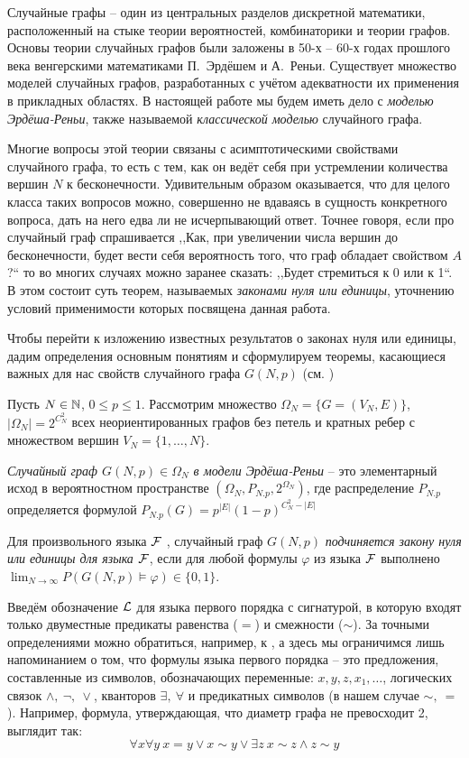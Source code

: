    Случайные графы -- один из центральных разделов дискретной математики, расположенный на стыке теории вероятностей, комбинаторики и теории графов.
    Основы теории случайных графов были заложены в 50-х -- 60-х годах прошлого века венгерскими математиками П.~Эрдёшем и А.~Реньи.
    Существует множество моделей случайных графов, разработанных с учётом адекватности их применения в прикладных областях.
    В настоящей работе мы будем иметь дело с \textit{моделью Эрдёша-Реньи}, также называемой \textit{классической моделью} случайного графа.
    
    Многие вопросы этой теории связаны с асимптотическими свойствами случайного графа, то есть с тем, как он ведёт себя при устремлении количества вершин $N$ к бесконечности.
    Удивительным образом оказывается, что для целого класса таких вопросов можно, совершенно не вдаваясь в сущность конкретного вопроса, дать на него едва ли не исчерпывающий ответ.
    Точнее говоря, если про случайный граф спрашивается ,,Как, при увеличении числа вершин до бесконечности, будет вести себя вероятность того, что граф обладает свойством $A$?`` то во многих случаях можно заранее сказать: ,,Будет стремиться к 0 или к 1``.
    В этом состоит суть теорем, называемых \textit{законами нуля или единицы}, уточнению условий применимости которых посвящена данная работа.
    
    Чтобы перейти к изложению известных результатов о законах нуля или единицы, дадим определения основным понятиям и сформулируем теоремы, касающиеся важных для нас свойств случайного графа $G(N,p)$ (см. \cite{survey2015})
    
    Пусть $N \in \mathbb {N}$, $0 \leq p \leq 1$. Рассмотрим множество $\Omega_N = \{G = (V_N , E)\}$, $|\Omega_N| = 2^{C_N^2}$ всех неориентированных графов без петель и кратных ребер с множеством вершин $V_N = \{1, \ldots, N \}$.
    
    \Def \textit{Случайный граф $G(N, p) \in \Omega_N$  в модели Эрдёша-Реньи} -- это элементарный исход в вероятностном пространстве $(\Omega_N, P_{N.p}, 2^{\Omega_N})$, где  распределение $P_{N.p}$ определяется формулой $P_{N.p}(G) = p^{|E|}(1-p)^{C_N^2-|E|}$
    
    \Def Для произвольного языка $\mathcal{F}$ , случайный граф $G(N, p)$ \textit{подчиняется закону нуля или единицы для языка $\mathcal{F}$},
    если для любой формулы $\varphi$ из языка 
    $\mathcal{F}$  выполнено
    $\lim_{N \rightarrow \infty} P(G(N, p) \vDash \varphi) \in \{0, 1\}$.
    
    Введём обозначение $\mathcal{L}$ для языка первого порядка с сигнатурой, в которую входят только двуместные предикаты равенства ($=$) и смежности ($\sim$).
    За точными определениями можно обратиться, например, к
    \cite{shen}, а здесь мы ограничимся лишь напоминанием о том, что формулы языка первого порядка -- это предложения, составленные из символов, обозначающих переменные: 
    $x,y,z,x_1,\ldots$, 
    логических связок 
    $\wedge, ~\neg, ~\vee$, 
    кванторов 
    $\exists, ~\forall$ и 
    предикатных символов (в нашем случае
    $\sim, ~ =$).
    Например, формула, утверждающая, что диаметр графа не превосходит 2, выглядит так:
    \[
    \forall x \forall y ~ x=y \vee x\sim y \vee \exists z ~ x \sim z \wedge z \sim y
    \]
    
